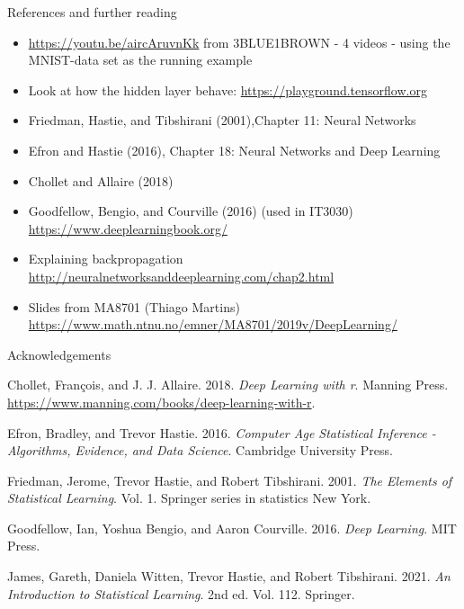 \documentclass[
  10pt,
  ignorenonframetext,
]{beamer}
\providecommand{\tightlist}{%
  \setlength{\itemsep}{0pt}\setlength{\parskip}{0pt}}
\newlength{\cslhangindent}
\newlength{\cslentryspacingunit} %
\newenvironment{CSLReferences}[2] %
 {%
  \setlength{\parindent}{0pt}
  \ifodd #1
  \let\oldpar\par
  \def\par{\hangindent=\cslhangindent\oldpar}
  \fi
  \setlength{\parskip}{#2\cslentryspacingunit}
 }%
 {}
\begin{document}
\begin{frame}{References and further reading}
\protect\hypertarget{references-and-further-reading}{}
\begin{itemize}
\tightlist
\item
  \url{https://youtu.be/aircAruvnKk} from 3BLUE1BROWN - 4 videos - using
  the MNIST-data set as the running example
\item
  Look at how the hidden layer behave:
  \url{https://playground.tensorflow.org}
\item
  Friedman, Hastie, and Tibshirani (2001),Chapter 11: Neural Networks
\item
  Efron and Hastie (2016), Chapter 18: Neural Networks and Deep Learning
\item
  Chollet and Allaire (2018)
\item
  Goodfellow, Bengio, and Courville (2016) (used in IT3030)
  \url{https://www.deeplearningbook.org/}
\item
  Explaining backpropagation
  \url{http://neuralnetworksanddeeplearning.com/chap2.html}
\item
  Slides from MA8701 (Thiago Martins)
  \url{https://www.math.ntnu.no/emner/MA8701/2019v/DeepLearning/}
\end{itemize}
\end{frame}

\begin{frame}{Acknowledgements}
\protect\hypertarget{acknowledgements-1}{}
\hypertarget{refs}{}
\begin{CSLReferences}{1}{0}
\leavevmode{}%
Chollet, François, and J. J. Allaire. 2018. \emph{Deep Learning with r}.
Manning Press. \url{https://www.manning.com/books/deep-learning-with-r}.

\leavevmode{}%
Efron, Bradley, and Trevor Hastie. 2016. \emph{Computer Age Statistical
Inference - Algorithms, Evidence, and Data Science}. Cambridge
University Press.

\leavevmode{}%
Friedman, Jerome, Trevor Hastie, and Robert Tibshirani. 2001. \emph{The
Elements of Statistical Learning}. Vol. 1. Springer series in statistics
New York.

\leavevmode{}%
Goodfellow, Ian, Yoshua Bengio, and Aaron Courville. 2016. \emph{Deep
Learning}. MIT Press.

\leavevmode{}%
James, Gareth, Daniela Witten, Trevor Hastie, and Robert Tibshirani.
2021. \emph{An Introduction to Statistical Learning}. 2nd ed. Vol. 112.
Springer.

\end{CSLReferences}
\end{frame}
\end{document}
